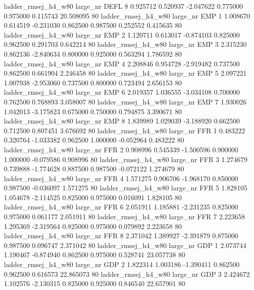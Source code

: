 ladder_rmsej_h4_w80   large_nr     DEFL                 8  0.925712  0.520937  -2.047622 0.775000 0.975000  0.115743   20.508095 80
ladder_rmsej_h4_w80   large_nr      EMP                 1  1.008670  0.614519  -0.231030 0.862500 0.987500  0.252552    0.415635 80
ladder_rmsej_h4_w80   large_nr      EMP                 2  1.120711  0.613017  -0.874103 0.825000 0.962500  0.291703    0.642214 80
ladder_rmsej_h4_w80   large_nr      EMP                 3  2.315230  0.862136  -2.840634 0.800000 0.925000  0.563294    1.786592 80
ladder_rmsej_h4_w80   large_nr      EMP                 4  2.208846  0.954728  -2.919482 0.737500 0.862500  0.661904    2.246458 80
ladder_rmsej_h4_w80   large_nr      EMP                 5  2.097221  1.007938  -2.953060 0.737500 0.800000  0.723494    2.656153 80
ladder_rmsej_h4_w80   large_nr      EMP                 6  2.019357  1.036555  -3.034108 0.700000 0.762500  0.768893    3.058007 80
ladder_rmsej_h4_w80   large_nr      EMP                 7  1.930026  1.042013  -3.175823 0.675000 0.750000  0.794875    3.390671 80
ladder_rmsej_h4_w80   large_nr      EMP                 8  1.839989  1.029039  -3.188920 0.662500 0.712500  0.807451    3.676692 80
ladder_rmsej_h4_w80   large_nr      FFR                 1  0.483222  0.320764  -1.033382 0.962500 1.000000 -0.052964    0.483222 80
ladder_rmsej_h4_w80   large_nr      FFR                 2  0.908996  0.545339  -1.500596 0.900000 1.000000 -0.079586    0.908996 80
ladder_rmsej_h4_w80   large_nr      FFR                 3  1.274679  0.739888  -1.774628 0.887500 0.987500 -0.072122    1.274679 80
ladder_rmsej_h4_w80   large_nr      FFR                 4  1.571275  0.906706  -1.968170 0.850000 0.987500 -0.036097    1.571275 80
ladder_rmsej_h4_w80   large_nr      FFR                 5  1.828105  1.054678  -2.114525 0.825000 0.975000  0.016091    1.828105 80
ladder_rmsej_h4_w80   large_nr      FFR                 6  2.051911  1.185881  -2.231235 0.825000 0.975000  0.061177    2.051911 80
ladder_rmsej_h4_w80   large_nr      FFR                 7  2.223658  1.295369  -2.319564 0.825000 0.975000  0.079892    2.223658 80
ladder_rmsej_h4_w80   large_nr      FFR                 8  2.371042  1.389927  -2.391879 0.875000 0.987500  0.096747    2.371042 80
ladder_rmsej_h4_w80   large_nr      GDP                 1  2.073744  1.190467  -0.874940 0.862500 0.975000  0.528741   23.057738 80
ladder_rmsej_h4_w80   large_nr      GDP                 2  1.822314  1.003186  -1.390411 0.862500 0.962500  0.616573   22.865073 80
ladder_rmsej_h4_w80   large_nr      GDP                 3  2.424672  1.102576  -2.130315 0.825000 0.925000  0.846540   22.657901 80
